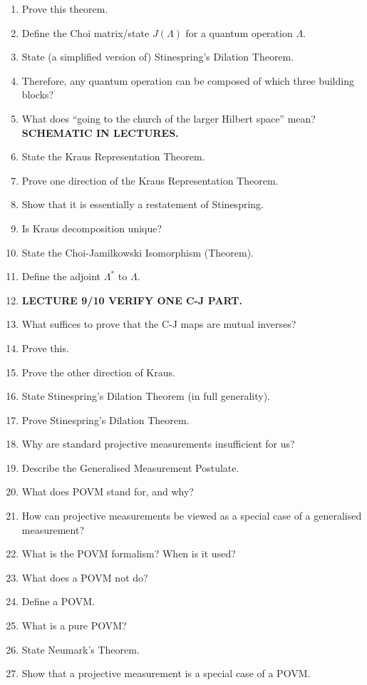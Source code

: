 \documentclass{article}
\begin{document}
\begin{enumerate}
    \item Prove this theorem.
    \item Define the Choi matrix/state $J(\Lambda)$ for a quantum operation $\Lambda$.
    \item State (a simplified version of) Stinespring's Dilation Theorem.
    \item Therefore, any quantum operation can be composed of which three building blocks?
    \item What does ``going to the church of the larger Hilbert space'' mean? \textbf{SCHEMATIC IN LECTURES.}
    \item State the Kraus Representation Theorem.
    \item Prove one direction of the Kraus Representation Theorem.
    \item Show that it is essentially a restatement of Stinespring.
    \item Is Kraus decomposition unique?
    \item State the Choi-Jamilkowski Isomorphism (Theorem).
    \item Define the adjoint $\Lambda^\ast$ to $\Lambda$.
    \item \textbf{LECTURE 9/10 VERIFY ONE C-J PART.}
    \item What suffices to prove that the C-J maps are mutual inverses?
    \item Prove this.
    \item Prove the other direction of Kraus.
    \item State Stinespring's Dilation Theorem (in full generality).
    \item Prove Stinespring's Dilation Theorem.
    \item Why are standard projective measurements insufficient for us?
    \item Describe the Generalised Measurement Postulate.
    \item What does POVM stand for, and why?
    \item How can projective measurements be viewed as a special case of a generalised measurement?
    \item What is the POVM formalism? When is it used?
    \item What does a POVM not do?
    \item Define a POVM.
    \item What is a pure POVM?
    \item State Neumark's Theorem.
    \item Show that a projective measurement is a special case of a POVM.

\end{enumerate}
\end{document}
